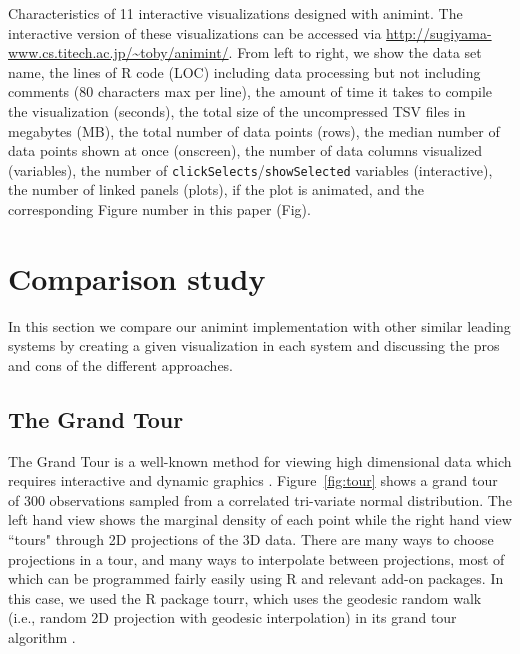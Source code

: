 \documentclass[journal]{vgtc}\usepackage[]{graphicx}\usepackage[]{color}
\begin{document}
\begin{table}[htp] %
  \centering
  
  \vskip 0.2cm
  \caption{Characteristics of 11 interactive visualizations designed with
    animint. The interactive version of these visualizations can be accessed 
    via \url{http://sugiyama-www.cs.titech.ac.jp/~toby/animint/}.
    From left to right, we show the data set name, the
    lines of R code (LOC) including data processing but not including comments
    (80 characters max per line),
    the amount of time it takes to compile the visualization (seconds),
    the total size of the uncompressed TSV files in megabytes (MB),
    the total number of data points (rows),
    the median number of data points shown at once (onscreen),
    the number of data columns visualized (variables),
    the number of \texttt{clickSelects}/\texttt{showSelected} 
    variables (interactive),
    the number of linked panels (plots),
    if the plot is animated,
    and the corresponding Figure number in this paper (Fig).
  }
\label{tab:examples}
\end{table}

\section{Comparison study}
\label{sec:compare}

In this section we compare our animint implementation with other similar
leading systems by creating a given visualization in each system and
discussing the pros and cons of the different approaches.

\subsection{The Grand Tour}
\label{sec:tour}

The Grand Tour is a well-known method for viewing high dimensional data which
requires interactive and dynamic graphics \citep{grand-tour}. 
Figure~\ref{fig:tour} shows a grand tour of 300 observations sampled
from a correlated tri-variate normal distribution. The left hand view
shows the marginal density of each point while the right hand view ``tours"
through 2D projections of the 3D data. There are many ways to
choose projections in a tour, and many ways to interpolate
between projections, most of which can be programmed fairly easily
using R and relevant add-on packages. In this case, we used the R package tourr,
which uses the geodesic random walk (i.e., random 2D projection with geodesic
interpolation) in its grand tour algorithm \citep{tourr}.
\end{document}
